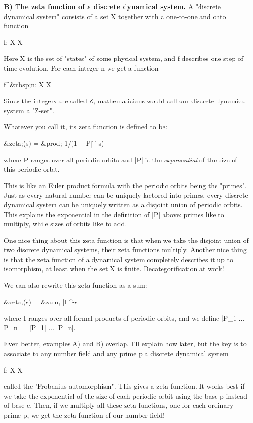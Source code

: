 \textbf{B) The zeta function of a discrete dynamical system.}  A "discrete
dynamical system" consists of a set X together with a one-to-one 
and onto function

f: X \to  X

Here X is the set of "states" of some physical system, and f describes 
one step of time evolution.  For each integer n we get a function

f^{&nbsp;n}: X \to  X

Since the integers are called Z, mathematicians would call our
discrete dynamical system a "Z-set".

Whatever you call it, its zeta function is defined to be:

&zeta;(s) = &prod;  1/(1 - |P|^{-s})

where P ranges over all periodic orbits and |P| is the 
\emph{exponential} of the size of this periodic orbit.  

This is like an Euler product formula with the periodic orbits 
being the "primes".  Just as every natural number can be uniquely 
factored into primes, every discrete dynamical system can be 
uniquely written as a disjoint union of periodic orbits.  
This explains the exponential in the definition of |P| above:
primes like to multiply, while sizes of orbits like to add.

One nice thing about this zeta function is that when we take
the disjoint union of two discrete dynamical systems, their zeta
functions multiply.  Another nice thing is that the zeta function
of a dynamical system completely describes it up to isomorphism, 
at least when the set X is finite.  Decategorification at work!
 
We can also rewrite this zeta function as a sum:

&zeta;(s) = &sum;  |I|^{-s}

where I ranges over all formal products of periodic orbits,
and we define |P_{1} ... P_{n}| = |P_{1}| ... |P_{n}|.  

Even better, examples A) and B) overlap.  I'll explain how later, but 
the key is to associate to any number field and any prime p a discrete 
dynamical system

f: X \to  X

called the "Frobenius automorphism".  This gives a zeta function.
It works best if we take the exponential of the size of each
periodic orbit using the base p instead of base e.   Then, if we 
multiply all these zeta functions, one for each ordinary prime p, 
we get the zeta function of our number field!  

